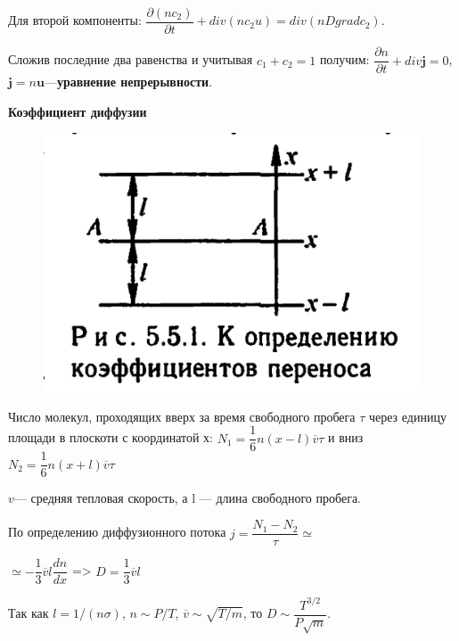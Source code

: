 Для второй компоненты:  $\dfrac{\partial(nc_2)}{\partial t}+div(nc_2u)=div(nDgradc_2)$.

Сложив последние два равенства и учитывая $c_1+c_2=1$ получим: $\dfrac{\partial n}{\partial t}+div\textbf{j}=0$, $\textbf{j}=n\textbf{u}$---\textbf{уравнение непрерывности}.

\textbf{Коэффициент диффузии}

\begin{figure} 
	\vspace{-5ex}
	\includegraphics[width=\linewidth]{koef}
	
\end{figure}

Число молекул, проходящих вверх за время свободного пробега $\tau$ через единицу площади в плоскоти с координатой х: $N_1=\dfrac{1}{6}n(x-l)\overline{\mathit{v}}\tau$ и вниз $N_2=\dfrac{1}{6}n(x+l)\overline{\mathit{v}}\tau$

$\mathit{v}$--- средняя тепловая скорость, а l --- длина свободного пробега.

По определению диффузионного потока $j=\dfrac{N_1-N_2}{\tau}\simeq$

$\simeq-\dfrac{1}{3}\overline{\mathit{v}}l\dfrac{dn}{dx}$ => $D=\dfrac{1}{3}\overline{\mathit{v}}l$

Так как $l=1/(n\sigma)$,\hspace{0.5 cm} $n\sim P/T$,\hspace{0.5 cm} $\overline{\mathit{v}}\sim\sqrt{T/m}$, то \hspace{0.5 cm}
$D\sim\dfrac{T^{3/2}}{P\sqrt{m}}$.